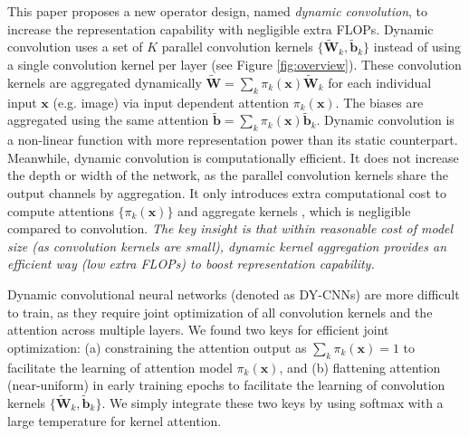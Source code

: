 \documentclass[10pt,twocolumn,letterpaper]{article}
\begin{document}
This paper proposes a new operator design, named \textit{dynamic convolution}, to increase the representation capability with negligible extra FLOPs. Dynamic convolution uses a set of $K$ parallel convolution kernels 
$\{\bm{\tilde{W}}_k, \bm{\tilde{b}}_k\}$ instead of using a single convolution kernel per layer (see Figure \ref{fig:overview}). 
%
These convolution kernels are aggregated dynamically $\bm{\tilde{W}}=\sum_k\pi_k(\bm{x})\bm{\tilde{W}}_k$ for each individual input $\bm{x}$ (e.g. image) via input dependent attention $\pi_k(\bm{x})$. The biases are aggregated using the same attention $\bm{\tilde{b}}=\sum_k\pi_k(\bm{x})\bm{\tilde{b}}_k$. 
%
Dynamic convolution is a non-linear function with more representation power than its static counterpart. Meanwhile, dynamic convolution is computationally efficient. It does not increase the depth or width of the network, as the parallel convolution kernels share the output channels by aggregation. It only introduces extra computational cost to compute attentions $\{\pi_k(\bm{x})\}$ and aggregate kernels 
, which is negligible compared to convolution. \textit{The key insight is that within reasonable cost of model size (as convolution kernels are small), dynamic kernel aggregation provides an efficient way (low extra FLOPs) to boost representation capability.}


Dynamic convolutional neural networks (denoted as DY-CNNs) are more difficult to train, as they require joint optimization of all convolution kernels and the attention across multiple layers. We found two keys for efficient joint optimization: (a) constraining the attention output as $\sum_k \pi_k(\bm{x}) = 1$ to facilitate the learning of attention model $\pi_k(\bm{x})$, and (b) flattening attention (near-uniform) in early training epochs to facilitate the learning of convolution kernels $\{\bm{\tilde{W}}_k, \bm{\tilde{b}}_k\}$. We simply integrate these two keys by using softmax with a large temperature for kernel attention.
\end{document}
